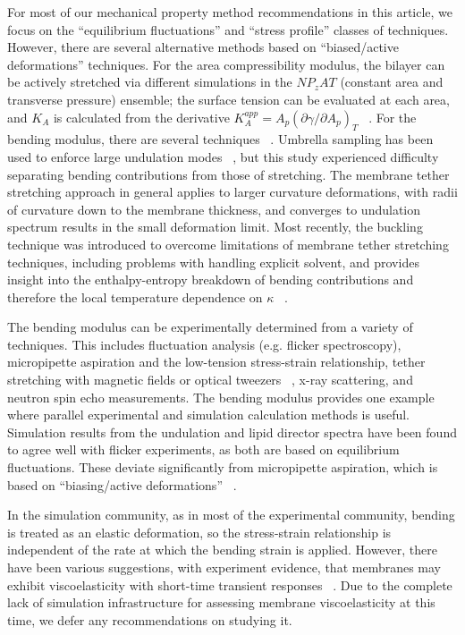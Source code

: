 \documentclass[9pt,bestpractices,pubversion]{livecoms}
\begin{document}
For most of our mechanical property method recommendations in this article, we focus on the ``equilibrium fluctuations'' and ``stress profile'' classes of techniques.
However, there are several alternative methods based on ``biased/active deformations'' techniques.
For the area compressibility modulus, the bilayer can be actively stretched via different simulations in the $NP_zAT$ (constant area and transverse pressure) ensemble; the surface tension can be evaluated at each area, and $K_A$ is calculated from the derivative $K_A^{app} = A_p(\partial \gamma / \partial A_p)_T$  ~\cite{Feller1995,Zhang1995}.
For the bending modulus, there are several techniques  ~\cite{Diggins2013,Shiba2011,Harmandaris2006a,DenOtter2003}.
Umbrella sampling has been used to enforce large undulation modes ~\cite{DenOtter2003}, but this study experienced difficulty separating bending contributions from those of stretching.
The membrane tether stretching approach in general applies to larger curvature deformations, with radii of curvature down to the membrane thickness, and converges to undulation spectrum results in the small deformation limit.
Most recently, the buckling technique was introduced to overcome limitations of membrane tether stretching techniques, including problems with handling explicit solvent, and provides insight into the enthalpy-entropy breakdown of bending contributions and therefore the local temperature dependence on $\kappa$  ~\cite{Diggins2013,Shiba2011}.

The bending modulus can be experimentally determined from a variety of techniques.
This includes fluctuation analysis (e.g. flicker spectroscopy), micropipette aspiration and the low-tension stress-strain relationship, tether stretching with magnetic fields or optical tweezers  ~\cite{Pontes2017,Wu2015c}, x-ray scattering, and neutron spin echo measurements.
The bending modulus provides one example where parallel experimental and simulation calculation methods is useful. Simulation results from the undulation and lipid director spectra have been found to agree well with flicker experiments, as both are based on equilibrium fluctuations.
These deviate significantly from micropipette aspiration, which is based on ``biasing/active deformations''  ~\cite{Venable2015}.

In the simulation community, as in most of the experimental community, bending is treated as an elastic deformation, so the stress-strain relationship is independent of the rate at which the bending strain is applied.
However, there have been various suggestions, with experiment evidence, that membranes may exhibit viscoelasticity with short-time transient responses ~\cite{Brown2011a,Wu2015c}.
Due to the complete lack of simulation infrastructure for assessing membrane viscoelasticity at this time, we defer any recommendations on studying it.
\end{document}
